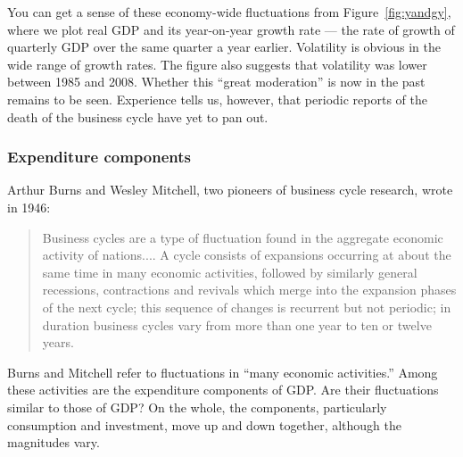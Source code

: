 \documentclass[letterpaper,12pt]{article}
\begin{document}
You can get a sense of these economy-wide fluctuations 
from Figure~\ref{fig:yandgy}, 
where we plot real GDP and its year-on-year growth rate --- 
the rate of growth of quarterly GDP over the same quarter a year earlier.
%
%
Volatility is obvious in the wide range of growth rates.
The figure also suggests that volatility was lower between 1985 
and 2008.   
Whether this ``great moderation'' is now in the past remains to be seen.  
Experience tells us, however, 
that periodic reports of the death of the business cycle
have yet to pan out.  



\subsubsection*{Expenditure components}

Arthur Burns and Wesley Mitchell, two pioneers of business cycle research, 
wrote in 1946:  
%
\begin{quote} 
{Business cycles are a type of
fluctuation found in the aggregate economic activity of
nations.... A cycle consists of expansions occurring at about the
same time in many economic activities, followed by similarly
general recessions, contractions and revivals which merge into the
expansion phases of the next cycle; this sequence of changes is
recurrent but not periodic; in duration business cycles vary from
more than one year to ten or twelve years.}
\end{quote}
%
Burns and Mitchell refer to fluctuations in 
``many economic activities.'' 
Among these activities are the expenditure
components of GDP.   
Are their fluctuations similar to those of GDP?
On the whole, the components, particularly consumption and investment, 
move up and down together, although the magnitudes vary.  
\end{document}
